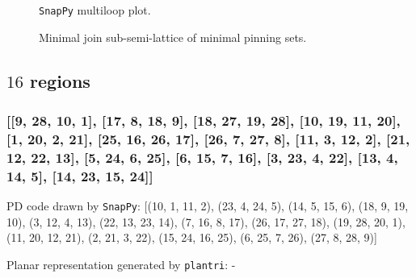 \documentclass{article}%
\begin{document}
\begin{multicols}{2}
\begin{figure}[H]
\centering

\caption{\texttt{SnapPy} multiloop plot.}
\label{fig:tex/img/[[26, 7, 1, 8], [8, 20, 9, 19], [14, 25, 15, 26], [15, 6, 16, 7], [1, 21, 2, 20], [9, 2, 10, 3], [3, 18, 4, 19], [4, 13, 5, 14], [5, 24, 6, 25], [16, 12, 17, 11], [21, 11, 22, 10], [22, 17, 23, 18], [.svg}
\end{figure}
\columnbreak

\begin{figure}[H]
\centering
\scalebox{0.8}{}
\caption{Minimal join sub-semi-lattice of minimal pinning sets.}
\label{fig:tex/img/[[26, 7, 1, 8], [8, 20, 9, 19], [14, 25, 15, 26], [15, 6, 16, 7], [1, 21, 2, 20], [9, 2, 10, 3], [3, 18, 4, 19], [4, 13, 5, 14], [5, 24, 6, 25], [16, 12, 17, 11], [21, 11, 22, 10], [22, 17, 23, 18], [.pgf}
\end{figure}
\end{multicols}

\newpage

\subsection{$16$ regions}

\subsubsection{[[9, 28, 10, 1], [17, 8, 18, 9], [18, 27, 19, 28], [10, 19, 11, 20], [1, 20, 2, 21], [25, 16, 26, 17], [26, 7, 27, 8], [11, 3, 12, 2], [21, 12, 22, 13], [5, 24, 6, 25], [6, 15, 7, 16], [3, 23, 4, 22], [13, 4, 14, 5], [14, 23, 15, 24]]}

{\small\noindent PD code drawn by \texttt{SnapPy}: [(10, 1, 11, 2), (23, 4, 24, 5), (14, 5, 15, 6), (18, 9, 19, 10), (3, 12, 4, 13), (22, 13, 23, 14), (7, 16, 8, 17), (26, 17, 27, 18), (19, 28, 20, 1), (11, 20, 12, 21), (2, 21, 3, 22), (15, 24, 16, 25), (6, 25, 7, 26), (27, 8, 28, 9)]}

{\small\noindent Planar representation generated by \texttt{plantri}: -}
\end{document}
